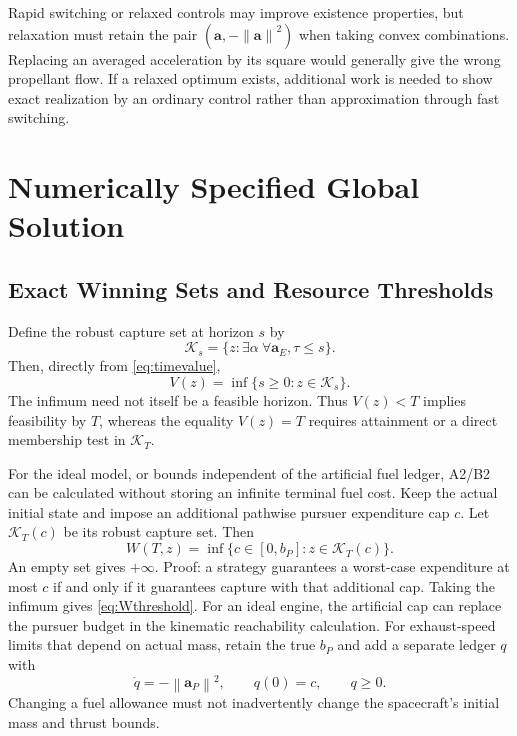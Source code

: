 \documentclass[journal,a4paper]{IEEEtran}
\newcommand{\norm}[1]{\left\|#1\right\|}
\begin{document}
Rapid switching or relaxed controls may improve existence properties, but relaxation must retain the pair $(\mathbf a,-\norm{\mathbf a}^2)$ when taking convex combinations. Replacing an averaged acceleration by its square would generally give the wrong propellant flow. If a relaxed optimum exists, additional work is needed to show exact realization by an ordinary control rather than approximation through fast switching.

\section{Numerically Specified Global Solution}
\label{sec:numerical}
\subsection{Exact Winning Sets and Resource Thresholds}
Define the robust capture set at horizon $s$ by
\begin{equation}
 \mathcal K_s=\{z:\exists\alpha\ \forall\mathbf a_E,
                                     \tau\le s\}.
 \label{eq:K}
\end{equation}
Then, directly from \eqref{eq:timevalue},
\begin{equation}
 \boxed{V(z)=\inf\{s\ge0:z\in\mathcal K_s\}.}
 \label{eq:VfromK}
\end{equation}
The infimum need not itself be a feasible horizon. Thus $V(z)<T$ implies feasibility by $T$, whereas the equality $V(z)=T$ requires attainment or a direct membership test in $\mathcal K_T$.

For the ideal model, or bounds independent of the artificial fuel ledger, A2/B2 can be calculated without storing an infinite terminal fuel cost. Keep the actual initial state and impose an additional pathwise pursuer expenditure cap $c$. Let $\mathcal K_T(c)$ be its robust capture set. Then
\begin{equation}
 \boxed{W(T,z)=\inf\{c\in[0,b_P]:z\in\mathcal K_T(c)\}.}
 \label{eq:Wthreshold}
\end{equation}
An empty set gives $+\infty$. Proof: a strategy guarantees a worst-case expenditure at most $c$ if and only if it guarantees capture with that additional cap. Taking the infimum gives \eqref{eq:Wthreshold}. For an ideal engine, the artificial cap can replace the pursuer budget in the kinematic reachability calculation. For exhaust-speed limits that depend on actual mass, retain the true $b_P$ and add a separate ledger $q$ with
\begin{equation}
 \dot q=-\norm{\mathbf a_P}^2,\qquad q(0)=c,\qquad q\ge0.
\end{equation}
Changing a fuel allowance must not inadvertently change the spacecraft's initial mass and thrust bounds.
\end{document}
